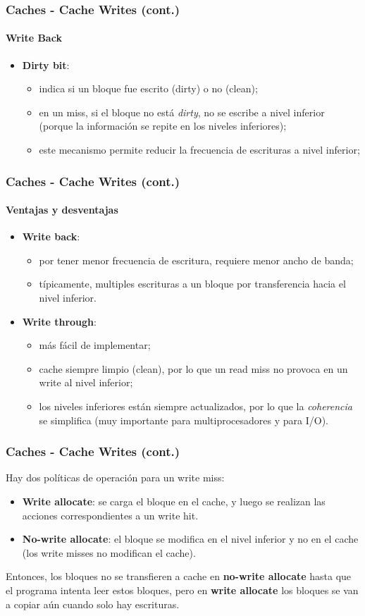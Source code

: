 \documentclass{beamer}
\begin{document}
 \begin{frame}
 \frametitle{Caches - Cache Writes (cont.)}
  \framesubtitle{Write Back}
    \begin{itemize}
	\item \textbf{Dirty bit}:
	\begin{itemize}
	  \item indica si un bloque fue escrito (dirty) o no (clean);
	  \item en un miss, si el bloque no está \emph{dirty}, no se escribe a
	  nivel inferior (porque la información se repite en los niveles
	  inferiores);
	  \item este mecanismo permite reducir la frecuencia de escrituras a
	  nivel inferior;
	\end{itemize}
    \end{itemize}
\end{frame}

\begin{frame}
\frametitle{Caches - Cache Writes (cont.)}
\framesubtitle{Ventajas y desventajas}
    \begin{itemize}
        \item \textbf{Write back}:
	\begin{itemize}
	  \item por tener menor frecuencia de escritura, requiere menor ancho
	  de banda;
	  \item típicamente, multiples escrituras a un bloque por transferencia
	  hacia el nivel inferior.
	\end{itemize}
	\bigskip
	\item \textbf{Write through}:
	\begin{itemize}
	  \item más fácil de implementar;
	  \item cache siempre limpio (clean), por lo que un read miss no provoca
	  en un write al nivel inferior;
	  \item los niveles inferiores están siempre actualizados, por lo que
	  la \emph{coherencia} se simplifica (muy importante para
	  multiprocesadores y para I/O).
	\end{itemize}
    \end{itemize}
  \end{frame}
  
    \begin{frame}
    \frametitle{Caches - Cache Writes (cont.)}
    Hay dos políticas de operación para un write miss:
    \bigskip
    \begin{itemize}
      \item \textbf{Write allocate}: se carga el bloque en el cache, y luego se
      realizan las acciones correspondientes a un write hit.
      \item \textbf{No-write allocate}: el bloque se modifica en el nivel
      inferior y no en el cache (los write misses no modifican el cache).
    \end{itemize}
    \bigskip
    Entonces, los bloques no se transfieren a cache en \textbf{no-write
    allocate} hasta que el programa intenta leer estos bloques, pero en
    \textbf{write allocate} los bloques se van a copiar aún cuando solo hay
    escrituras.
  \end{frame}
  
\end{document}
